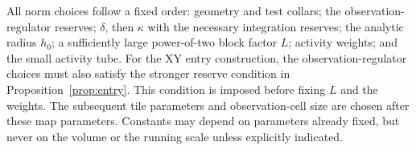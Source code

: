 All norm choices follow a fixed order: geometry and test collars;
the observation-regulator reserves;
\(\delta\), then \(\kappa\) with the necessary integration reserves;
the analytic radius \(h_0\); a sufficiently large power-of-two
block factor \(L\); activity weights; and the small activity tube.
For the XY entry construction, the observation-regulator choices must
also satisfy the stronger reserve condition in Proposition~\ref{prop:entry}.
This condition is imposed before fixing \(L\) and the weights.
The subsequent tile parameters and observation-cell size are chosen
after these map parameters.  Constants may depend on parameters
already fixed, but never on the volume or the running scale unless
explicitly indicated.

